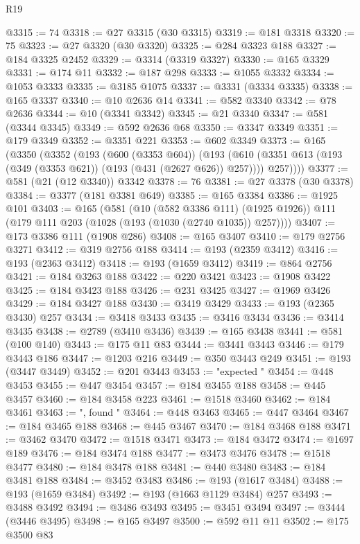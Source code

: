\begin{lexlean}{R19}
\begin{coremodule}
@3315 := 74
@3318 := @27 @3315 (@30 @3315)
@3319 := @181 @3318
@3320 := 75
@3323 := @27 @3320 (@30 @3320)
@3325 := @284 @3323 @188
@3327 := @184 @3325 @2452
@3329 := @3314 (@3319 @3327)
@3330 := @165 @3329
@3331 := @174 @11
@3332 := @187 @298
@3333 := @1055 @3332
@3334 := @1053 @3333
@3335 := @3185 @1075
@3337 := @3331 (@3334 @3335)
@3338 := @165 @3337
@3340 := @10 @2636 @14
@3341 := @582 @3340
@3342 := @78 @2636
@3344 := @10 (@3341 @3342)
@3345 := @21 @3340
@3347 := @581 (@3344 @3345)
@3349 := @592 @2636 @68
@3350 := @3347 @3349
@3351 := @179 @3349
@3352 := @3351 @221
@3353 := @602 @3349
@3373 := @165
    (@3350
      (@3352
        (@193
          (@600 (@3353 @604))
          (@193
            (@610 (@3351 @613 (@193 (@349 (@3353 @621)) (@193 (@431 (@2627 @626)) @257))))
            @257))))
@3377 := @581 (@21 (@12 @3340)) @3342
@3378 := 76
@3381 := @27 @3378 (@30 @3378)
@3384 := @3377 (@181 @3381 @649)
@3385 := @165 @3384
@3386 := @1925 @101
@3403 := @165
    (@581
      (@10 (@582 @3386 @111) (@1925 @1926))
      @111
      (@179 @111 @203 (@1028 (@193 (@1030 (@2740 @1035)) @257))))
@3407 := @173 @3386 @111 (@1908 @286)
@3408 := @165 @3407
@3410 := @179 @2756 @3271
@3412 := @319 @2756 @188
@3414 := @193 (@2359 @3412)
@3416 := @193 (@2363 @3412)
@3418 := @193 (@1659 @3412)
@3419 := @864 @2756
@3421 := @184 @3263 @188
@3422 := @220 @3421
@3423 := @1908 @3422
@3425 := @184 @3423 @188
@3426 := @231 @3425
@3427 := @1969 @3426
@3429 := @184 @3427 @188
@3430 := @3419 @3429
@3433 := @193 (@2365 @3430) @257
@3434 := @3418 @3433
@3435 := @3416 @3434
@3436 := @3414 @3435
@3438 := @2789 (@3410 @3436)
@3439 := @165 @3438
@3441 := @581 (@100 @140)
@3443 := @175 @11 @83
@3444 := @3441 @3443
@3446 := @179 @3443 @186
@3447 := @1203 @216
@3449 := @350 @3443 @249
@3451 := @193 (@3447 @3449)
@3452 := @201 @3443
@3453 := "expected "
@3454 := @448 @3453
@3455 := @447 @3454
@3457 := @184 @3455 @188
@3458 := @445 @3457
@3460 := @184 @3458 @223
@3461 := @1518 @3460
@3462 := @184 @3461
@3463 := ", found "
@3464 := @448 @3463
@3465 := @447 @3464
@3467 := @184 @3465 @188
@3468 := @445 @3467
@3470 := @184 @3468 @188
@3471 := @3462 @3470
@3472 := @1518 @3471
@3473 := @184 @3472
@3474 := @1697 @189
@3476 := @184 @3474 @188
@3477 := @3473 @3476
@3478 := @1518 @3477
@3480 := @184 @3478 @188
@3481 := @440 @3480
@3483 := @184 @3481 @188
@3484 := @3452 @3483
@3486 := @193 (@1617 @3484)
@3488 := @193 (@1659 @3484)
@3492 := @193 (@1663 @1129 @3484) @257
@3493 := @3488 @3492
@3494 := @3486 @3493
@3495 := @3451 @3494
@3497 := @3444 (@3446 @3495)
@3498 := @165 @3497
@3500 := @592 @11 @11
@3502 := @175 @3500 @83

\end{coremodule}
\end{lexlean}
